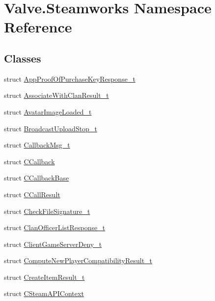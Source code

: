 \hypertarget{namespaceValve_1_1Steamworks}{}\section{Valve.\+Steamworks Namespace Reference}
\label{namespaceValve_1_1Steamworks}
\subsection*{Classes}
\begin{DoxyCompactItemize}
\item 
struct \hyperlink{structValve_1_1Steamworks_1_1AppProofOfPurchaseKeyResponse__t}{App\+Proof\+Of\+Purchase\+Key\+Response\+\_\+t}
\item 
struct \hyperlink{structValve_1_1Steamworks_1_1AssociateWithClanResult__t}{Associate\+With\+Clan\+Result\+\_\+t}
\item 
struct \hyperlink{structValve_1_1Steamworks_1_1AvatarImageLoaded__t}{Avatar\+Image\+Loaded\+\_\+t}
\item 
struct \hyperlink{structValve_1_1Steamworks_1_1BroadcastUploadStop__t}{Broadcast\+Upload\+Stop\+\_\+t}
\item 
struct \hyperlink{structValve_1_1Steamworks_1_1CallbackMsg__t}{Callback\+Msg\+\_\+t}
\item 
struct \hyperlink{structValve_1_1Steamworks_1_1CCallback}{C\+Callback}
\item 
struct \hyperlink{structValve_1_1Steamworks_1_1CCallbackBase}{C\+Callback\+Base}
\item 
struct \hyperlink{structValve_1_1Steamworks_1_1CCallResult}{C\+Call\+Result}
\item 
struct \hyperlink{structValve_1_1Steamworks_1_1CheckFileSignature__t}{Check\+File\+Signature\+\_\+t}
\item 
struct \hyperlink{structValve_1_1Steamworks_1_1ClanOfficerListResponse__t}{Clan\+Officer\+List\+Response\+\_\+t}
\item 
struct \hyperlink{structValve_1_1Steamworks_1_1ClientGameServerDeny__t}{Client\+Game\+Server\+Deny\+\_\+t}
\item 
struct \hyperlink{structValve_1_1Steamworks_1_1ComputeNewPlayerCompatibilityResult__t}{Compute\+New\+Player\+Compatibility\+Result\+\_\+t}
\item 
struct \hyperlink{structValve_1_1Steamworks_1_1CreateItemResult__t}{Create\+Item\+Result\+\_\+t}
\item 
struct \hyperlink{structValve_1_1Steamworks_1_1CSteamAPIContext}{C\+Steam\+A\+P\+I\+Context}

\end{DoxyCompactItemize}
